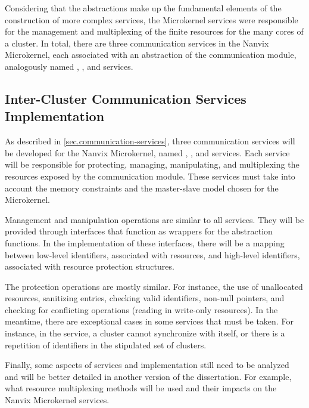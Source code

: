 			Considering that the abstractions make up the fundamental elements of
			the construction of more complex services, the Microkernel services
			were responsible for the management and multiplexing of the finite
			resources for the many cores of a cluster.
			In total, there are three communication services in the Nanvix Microkernel,
			each associated with an abstraction of the communication module,
			analogously named \sync, \mailbox, and \portal services.

		\subsection{Inter-Cluster Communication Services Implementation}


			As described in \autoref{sec.communication-services}, three communication
			services will be developed for the Nanvix Microkernel, named \sync, \mailbox,
			and \portal services.
			Each service will be responsible for protecting, managing, manipulating,
			and multiplexing the resources exposed by the \hal communication module.
			These services must take into account the memory constraints and the
			master-slave model chosen for the Microkernel.

			Management and manipulation operations are similar to all services.
			They will be provided through interfaces that function as wrappers
			for the \hal abstraction functions.
			In the implementation of these interfaces, there will be a mapping
			between low-level identifiers, associated with \hal resources,
			and high-level identifiers, associated with resource protection structures.


			The protection operations are mostly similar.
			For instance, the use of unallocated resources, sanitizing entries,
			checking valid identifiers, non-null pointers, and checking
			for conflicting operations (reading in write-only resources).
			In the meantime, there are exceptional cases in some services
			that must be taken.
			For instance, in the \sync service, a cluster cannot synchronize
			with itself, or there is a repetition of identifiers in the
			stipulated set of clusters.

			Finally, some aspects of services and implementation still need
			to be analyzed and will be better detailed in another version
			of the dissertation.
			For example, what resource multiplexing methods will be used
			and their impacts on the Nanvix Microkernel services.